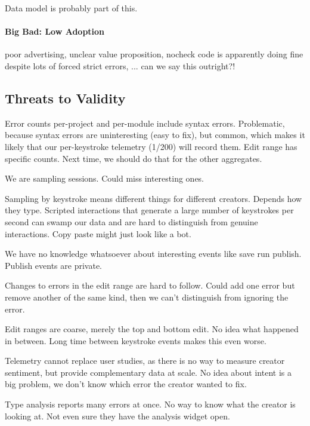 \documentclass[english,submission,cleveref]{programming}
\begin{document}
Data model is probably part of this.



\paragraph{Big Bad: Low Adoption}

poor advertising,
unclear value proposition,
nocheck code is apparently doing fine despite lots of forced strict errors,
... can we say this outright?!


\subsection{Threats to Validity}
\label{s:threats}

Error counts per-project and per-module include syntax errors.
Problematic, because syntax errors are uninteresting (easy to fix),
but common, which makes it likely that our per-keystroke telemetry (1/200) will record them.
Edit range has specific counts.
Next time, we should do that for the other aggregates.

We are sampling sessions. Could miss interesting ones.

Sampling by keystroke means different things for different creators.
Depends how they type.
Scripted interactions that generate a large number of keystrokes per second
can swamp our data and are hard to distinguish from genuine interactions.
Copy paste might just look like a bot.

We have no knowledge whatsoever about interesting events like save run publish.
Publish events are private.

Changes to errors in the edit range are hard to follow.
Could add one error but remove another of the same kind,
then we can't distinguish from ignoring the error.

Edit ranges are coarse, merely the top and bottom edit.
No idea what happened in between.
Long time between keystroke events makes this even worse.

Telemetry cannot replace user studies, as there is no way to measure
creator sentiment, but provide complementary data at scale.
No idea about intent is a big problem, we don't know which error the creator wanted to fix.

Type analysis reports many errors at once.
No way to know what the creator is looking at.
Not even sure they have the analysis widget open.
\end{document}

